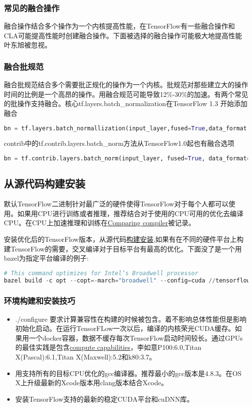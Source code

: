  \subsubsection{常见的融合操作}
 融合操作结合多个操作为一个内核提高性能，在TensorFlow有一些融合操作和CLA可能提高性能时创建融合操作。下面被选择的融合操作可能极大地提高性能叶东旭被忽视。
 \subsubsection{融合批规范}
 融合批规范结合多个需要批正规化的操作为一个内核。批规范对那些建立大的操作时间的比例是一个高昂的操作。用融合规范可能导致12\%-30\%的加速。有两个常见的批操作支持融合。核心tf.layers.batch\_normalization在TensorFlow 1.3 开始添加融合
 \begin{lstlisting}[language=Python]
 bn = tf.layers.batch_normallization(input_layer,fused=True,data_format = 'NCHW')
 \end{lstlisting}
 contrib中的tf.contrib.layers.batch\_norm方法从TensorFlow1.0起也有融合选项
 \begin{lstlisting}[language=Python]
 bn = tf.contrib.layers.batch_norm(input_layer, fused=True, data_format='NCHW
 \end{lstlisting}
\subsection{从源代码构建安装}
默认TensorFlow二进制针对最广泛的硬件使得TensorFlow对于每个人都可以使用。如果用CPU进行训练或者推理，推荐结合对于使用的CPU可用的优化去编译CPU。在CPU上加速推理和训练在\href{https://www.tensorflow.org/performance/performance_guide#comparing_compiler_optimizations}{Comparing compiler}被记录。

安装优化后的TensorFlow版本，从源代码\href{Comparing compiler}{构建安装},如果有在不同的硬件平台上构建TensorFlow的需要，交叉编译对于目标平台有最高的优化。下面没了是一个用bazel为指定平台编译的例子:
\begin{lstlisting}[language=Python]
# This command optimizes for Intel’s Broadwell processor
bazel build -c opt --copt=-march="broadwell" --config=cuda //tensorflow/tools/pip_package:build_pip_package
\end{lstlisting}
\subsubsection{环境构建和安装技巧}
\begin{itemize}
	\item ./configure 要求计算兼容性在构建的时候被包含。着不影响总体性能但是影响初始化启动。在运行TensorFLow一次以后，编译的内核荣光CUDA缓存。如果用一个docker容器，数据不缓存每次TensorFlow启动时间较长。通过GPUs的最佳实践是包含\href{http://developer.nvidia.com/cuda-gpus}{compute capabilities}，李如意P100:6.0,Titan X(Pascal):6.1,Titan X(Maxwell):5.2和k80:3.7。
	\item 用支持所有的目标CPU优化的gcc编译器。推荐最小的gcc版本是4.8.3。在OS X上升级最新的Xcode版本用clang版本结合Xcode。
	\item 安装TensorFlow支持的最新的稳定CUDA平台和cuDNN库。
\end{itemize}
